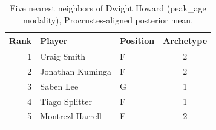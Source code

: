 \begin{table}[htbp]
  \centering\small
  \begin{tabular}{rllc}
    \toprule
    Rank & Player & Position & Archetype \\
    \midrule
    1 & Craig Smith & F & 2 \\
    2 & Jonathan Kuminga & F & 2 \\
    3 & Saben Lee & G & 1 \\
    4 & Tiago Splitter & F & 1 \\
    5 & Montrezl Harrell & F & 2 \\
    \bottomrule
  \end{tabular}
  \caption{Five nearest neighbors of Dwight Howard (peak_age modality), Procrustes-aligned posterior mean.}
  \label{tab:Dwight_Howard_neighbors_peak_age}
\end{table}

